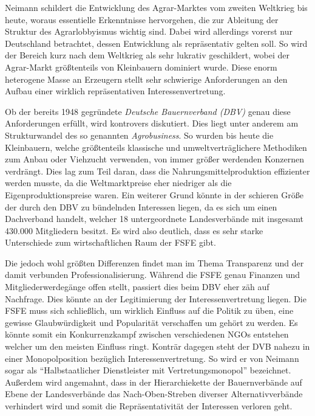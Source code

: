Neimann \cite{Neimann200312} schildert die Entwicklung des Agrar-Marktes vom 
zweiten Weltkrieg bis 
heute, woraus essentielle Erkenntnisse hervorgehen, die zur Ableitung der 
Struktur des Agrarlobbyismus wichtig sind. Dabei wird allerdings vorerst nur 
Deutschland betrachtet, dessen Entwicklung als repräsentativ gelten soll. So 
wird der Bereich kurz nach dem Weltkrieg als sehr lukrativ geschildert, wobei 
der Agrar-Markt größtenteils von Kleinbauern dominiert wurde. Diese enorm 
heterogene Masse an Erzeugern stellt sehr schwierige Anforderungen an den 
Aufbau einer wirklich repräsentativen Interessenvertretung.

Ob der bereits 1948 gegründete \emph{Deutsche Bauernverband (DBV)} genau diese 
Anforderungen erfüllt, wird 
kontrovers diskutiert. \cite{Neimann200312} Dies liegt unter anderem am 
Strukturwandel des so genannten \emph{Agrobusiness}. So wurden bis heute die 
Kleinbauern, welche größtenteils klassische und umweltverträglichere Methodiken 
zum Anbau oder Viehzucht verwenden, von immer größer werdenden Konzernen 
verdrängt. Dies lag zum Teil daran, dass die Nahrungsmittelproduktion 
effizienter werden musste, da die Weltmarktpreise eher niedriger als die 
Eigenproduktionspreise waren. Ein weiterer Grund könnte in der schieren Größe 
der durch den DBV zu bündelnden Interessen liegen, da es sich um einen 
Dachverband handelt, welcher 18 untergeordnete Landesverbände mit insgesamt 
430.000 Mitgliedern besitzt. \cite{Neimann200312} Es wird also deutlich, dass 
es sehr starke 
Unterschiede zum wirtschaftlichen Raum der FSFE gibt.

Die jedoch wohl größten Differenzen findet man im Thema Transparenz und der 
damit verbunden Professionalisierung. Während die FSFE genau Finanzen und 
Mitgliederwerdegänge offen stellt, passiert dies beim DBV eher zäh auf 
Nachfrage. Dies könnte \zB an der Legitimierung der Interessenvertretung 
liegen. Die FSFE muss sich schließlich, um wirklich Einfluss auf die Politik zu 
üben, eine gewisse Glaubwürdigkeit und Popularität verschaffen um gehört zu 
werden. Es könnte somit ein Konkurrenzkampf zwischen verschiedenen NGOs 
entstehen welcher um den meisten Einfluss ringt. Konträr dagegen steht der DVB 
nahezu in einer Monopolposition bezüglich Interessenvertretung. So wird er von 
Neimann sogar als ``Halbstaatlicher Dienstleister mit Vertretungsmonopol'' 
\cite{Neimann200312} bezeichnet. Außerdem wird angemahnt, dass in der 
Hierarchiekette der Bauernverbände auf Ebene der Landesverbände das 
Nach-Oben-Streben diverser Alternativverbände verhindert wird und somit die 
Repräsentativität der Interessen verloren geht.


